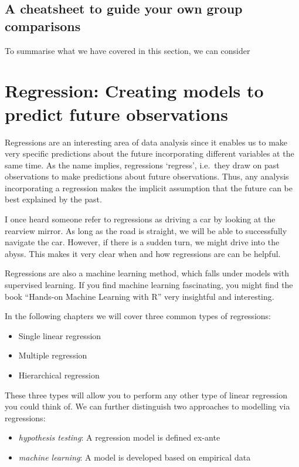 \documentclass[
]{book}
\begin{document}
\hypertarget{cheatsheet-group-comparisons}{%
\section{A cheatsheet to guide your own group comparisons}\label{cheatsheet-group-comparisons}}

To summarise what we have covered in this section, we can consider

\hypertarget{regression}{%
\chapter{Regression: Creating models to predict future observations}\label{regression}}

Regressions are an interesting area of data analysis since it enables us to make very specific predictions about the future incorporating different variables at the same time. As the name implies, regressions `regress', i.e.~they draw on past observations to make predictions about future observations. Thus, any analysis incorporating a regression makes the implicit assumption that the future can be best explained by the past.

I once heard someone refer to regressions as driving a car by looking at the rearview mirror. As long as the road is straight, we will be able to successfully navigate the car. However, if there is a sudden turn, we might drive into the abyss. This makes it very clear when and how regressions are can be helpful.

Regressions are also a machine learning method, which falls under models with supervised learning. If you find machine learning fascinating, you might find the book ``Hands-on Machine Learning with R'' \citep{boehmke2019hands} very insightful and interesting.

In the following chapters we will cover three common types of regressions:

\begin{itemize}
\item
  Single linear regression
\item
  Multiple regression
\item
  Hierarchical regression
\end{itemize}

These three types will allow you to perform any other type of linear regression you could think of. We can further distinguish two approaches to modelling via regressions:

\begin{itemize}
\item
  \emph{hypothesis testing}: A regression model is defined ex-ante
\item
  \emph{machine learning}: A model is developed based on empirical data
\end{itemize}
\end{document}

